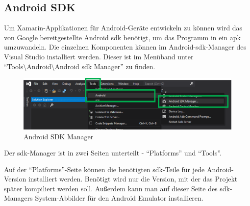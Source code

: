 \subsection{Android SDK}
Um Xamarin-Applikationen für Android-Geräte entwickeln zu können wird das von Google bereitgestellte Android \ac{sdk} benötigt, um das Programm in ein \ac{apk} umzuwandeln. Die einzelnen Komponenten können im Android-\ac{sdk}-Manager des Visual Studio installiert werden.
Dieser ist im Menüband unter \enquote{Tools\textbackslash Android\textbackslash Android \ac{sdk} Manager} zu finden.
\begin{figure}[H]
    \centering\includegraphics[width=0.9\linewidth]{images/auswahl_rahmenwerk/android_sdk_installation.png}    
    \caption{Android SDK Manager}
\end{figure}
Der \ac{sdk}-Manager ist in zwei Seiten unterteilt - \enquote{Platforms} und \enquote{Tools}.\par

Auf der \enquote{Plat\-forms}-Seite können die benötigten \ac{sdk}-Teile für jede Android-Version installiert werden.
Benötigt wird nur die Version, mit der das Projekt später kompiliert werden soll.
Außerdem kann man auf dieser Seite des \ac{sdk}-Managers System-Abbilder für den Android Emulator installieren.\par

